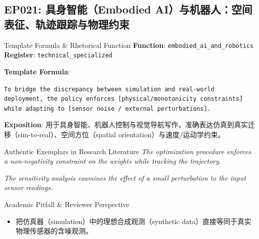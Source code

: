\subsection{EP021: 具身智能（Embodied AI）与机器人：空间表征、轨迹跟踪与物理约束}\label{sec:ep:EP021}
\begin{ConceptBox}{Template Formula \& Rhetorical Function}
\textbf{Function}: \texttt{embodied\_ai\_and\_robotics} \quad \textbf{Register}: \texttt{technical\_specialized}\par\vspace{3pt}
\textbf{Template Formula}:\par\noindent\texttt{To bridge the discrepancy between simulation and real-world deployment, the policy enforces [physical/monotonicity constraints] while adapting to [sensor noise / external perturbations].}\par\vspace{4pt}
\textbf{Exposition}: 用于具身智能、机器人控制与视觉导航写作，准确表达仿真到真实迁移（sim-to-real）、空间方位（spatial orientation）与速度/运动学约束。
\end{ConceptBox}
\begin{ExampleBox}{Authentic Exemplars in Research Literature}
\textit{The optimization procedure enforces a non-negativity constraint on the weights while tracking the trajectory.}\par\vspace{2pt}
\textit{The sensitivity analysis examines the effect of a small perturbation to the input sensor readings.}\par\vspace{2pt}
\end{ExampleBox}
\begin{TipBox}{Academic Pitfall \& Reviewer Perspective}
\begin{itemize}[leftmargin=1.5em, itemsep=1pt]
  \item 把仿真器（simulation）中的理想合成观测（synthetic data）直接等同于真实物理传感器的含噪观测。
\end{itemize}
\end{TipBox}
\vspace{6pt}
